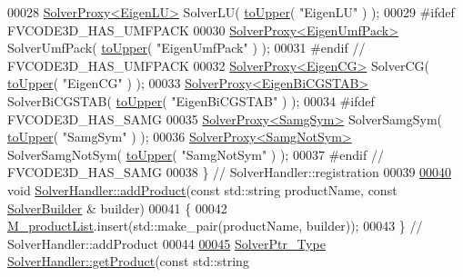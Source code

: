 \begin{DoxyCode}
00028     \hyperlink{classFVCode3D_1_1SolverProxy}{SolverProxy<EigenLU>}        SolverLU( \hyperlink{namespaceFVCode3D_aab0ceb729c2ff3e7fd288097aee76a59}{toUpper}( \textcolor{stringliteral}{"EigenLU"} ) );
00029 \textcolor{preprocessor}{#ifdef FVCODE3D\_HAS\_UMFPACK}
00030     \hyperlink{classFVCode3D_1_1SolverProxy}{SolverProxy<EigenUmfPack>}   SolverUmfPack( \hyperlink{namespaceFVCode3D_aab0ceb729c2ff3e7fd288097aee76a59}{toUpper}( \textcolor{stringliteral}{"EigenUmfPack"} ) );
00031 \textcolor{preprocessor}{#endif // FVCODE3D\_HAS\_UMFPACK}
00032     \hyperlink{classFVCode3D_1_1SolverProxy}{SolverProxy<EigenCG>}        SolverCG( \hyperlink{namespaceFVCode3D_aab0ceb729c2ff3e7fd288097aee76a59}{toUpper}( \textcolor{stringliteral}{"EigenCG"} ) );
00033     \hyperlink{classFVCode3D_1_1SolverProxy}{SolverProxy<EigenBiCGSTAB>}  SolverBiCGSTAB( 
      \hyperlink{namespaceFVCode3D_aab0ceb729c2ff3e7fd288097aee76a59}{toUpper}( \textcolor{stringliteral}{"EigenBiCGSTAB"} ) );
00034 \textcolor{preprocessor}{#ifdef FVCODE3D\_HAS\_SAMG}
00035     \hyperlink{classFVCode3D_1_1SolverProxy}{SolverProxy<SamgSym>}        SolverSamgSym( \hyperlink{namespaceFVCode3D_aab0ceb729c2ff3e7fd288097aee76a59}{toUpper}( \textcolor{stringliteral}{"SamgSym"} ) );
00036     \hyperlink{classFVCode3D_1_1SolverProxy}{SolverProxy<SamgNotSym>}     SolverSamgNotSym( \hyperlink{namespaceFVCode3D_aab0ceb729c2ff3e7fd288097aee76a59}{toUpper}( \textcolor{stringliteral}{"SamgNotSym"} ) );
00037 \textcolor{preprocessor}{#endif // FVCODE3D\_HAS\_SAMG}
00038 \} \textcolor{comment}{// SolverHandler::registration}
00039 
\hypertarget{SolverHandler_8cpp_source.tex_l00040}{}\hyperlink{classFVCode3D_1_1SolverHandler_a2d1850e99d392d23fa2a492e0b55ab08}{00040} \textcolor{keywordtype}{void} \hyperlink{classFVCode3D_1_1SolverHandler_a2d1850e99d392d23fa2a492e0b55ab08}{SolverHandler::addProduct}(\textcolor{keyword}{const} std::string productName, \textcolor{keyword}{const} 
      \hyperlink{namespaceFVCode3D_ae1d65e23bd2373e382d1f397337de344}{SolverBuilder} & builder)
00041 \{
00042     \hyperlink{classFVCode3D_1_1SolverHandler_a8c2ce305ada54d628a080f7f33d09140}{M\_productList}.insert(std::make\_pair(productName, builder));
00043 \} \textcolor{comment}{// SolverHandler::addProduct}
00044 
\hypertarget{SolverHandler_8cpp_source.tex_l00045}{}\hyperlink{classFVCode3D_1_1SolverHandler_a15e31d74d5411d2e3eb3ba00140dbeed}{00045} \hyperlink{namespaceFVCode3D_a0b32227a4e5847c2fb27215fb81d9363}{SolverPtr\_Type} \hyperlink{classFVCode3D_1_1SolverHandler_a15e31d74d5411d2e3eb3ba00140dbeed}{SolverHandler::getProduct}(\textcolor{keyword}{const} std::string 

\end{DoxyCode}
